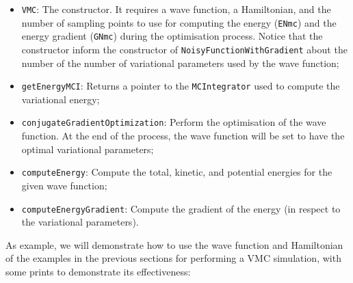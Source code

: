 \documentclass[11pt,a4paper,twoside]{article}
\begin{document}
\begin{itemize}
   \item \verb+VMC+: The constructor. It requires a wave function, a Hamiltonian, and the number of sampling points to use for computing the energy (\verb+ENmc+) and the energy gradient (\verb+GNmc+) during the optimisation process. Notice that the constructor inform the constructor of \verb+NoisyFunctionWithGradient+ about the number of the number of variational parameters used by the wave function;
   \item \verb+getEnergyMCI+: Returns a pointer to the \verb+MCIntegrator+ used to compute the variational energy;
   \item \verb+conjugateGradientOptimization+: Perform the optimisation of the wave function. At the end of the process, the wave function will be set to have the optimal variational parameters;
   \item \verb+computeEnergy+: Compute the total, kinetic, and potential energies for the given wave function;
   \item \verb+computeEnergyGradient+: Compute the gradient of the energy (in respect to the variational parameters).
\end{itemize}

As example, we will demonstrate how to use the wave function and Hamiltonian of the examples in the previous sections for performing a VMC simulation, with some prints to demonstrate its effectiveness:
\end{document}
